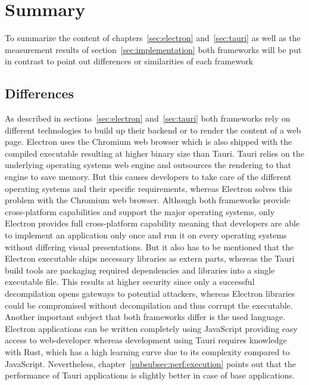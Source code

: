 \section{Summary}
\label{sec:summary}
To summarize the content of chapters~\ref{sec:electron} and~\ref{sec:tauri} as well as the measurement results of section~\ref{sec:implementation}
both frameworks will be put in contrast to point out differences or similarities of each framework
\subsection{Differences}\label{subsec:differences}
As described in sections~\ref{sec:electron} and~\ref{sec:tauri} both frameworks rely on different technologies to build up their backend or to render the content of a web page.
Electron uses the Chromium web browser which is also shipped with the compiled executable resulting at higher binary size than Tauri.
Tauri relies on the underlying operating systems web engine and outsources the rendering to that engine to save memory.
But this causes developers to take care of the different operating systems and their specific requirements, whereas Electron solves this problem with the Chromium web browser.
Although both frameworks provide cross-platform capabilities and support the major operating systems, only Electron provides full cross-platform capability meaning that developers are able to implement an application only once
and run it on every operating systems without differing visual presentations.
But it also has to be mentioned that the Electron executable ships necessary libraries as extern parts, whereas the Tauri build tools are packaging required dependencies and libraries into a single executable file.
This results at higher security since only a successful decompilation opens gateways to potential attackers, whereas Electron libraries could be compromised without decompilation and thus corrupt the executable.
Another important subject that both frameworks differ is the used language.
Electron applications can be written completely using JavaScript providing easy access to web-developer whereas development using Tauri requires knowledge with Rust, which has a high learning curve due to its complexity compared to JavaScript.
Nevertheless, chapter~\ref{subsubsec:perf:execution} points out that the performance of Tauri applications is slightly better in case of base applications.
